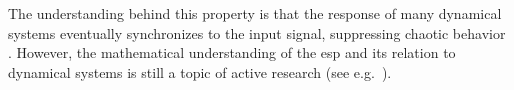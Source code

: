 The understanding behind this property is that the response of many dynamical systems eventually synchronizes to the input signal, suppressing chaotic behavior \citep{nakajima_physical_2020}. 
However, the mathematical understanding of the \acrshort{esp} and its relation to dynamical systems is still a topic of active research (see e.g.\ \cite{yildiz_re-visiting_2012, lu_attractor_2018}).

